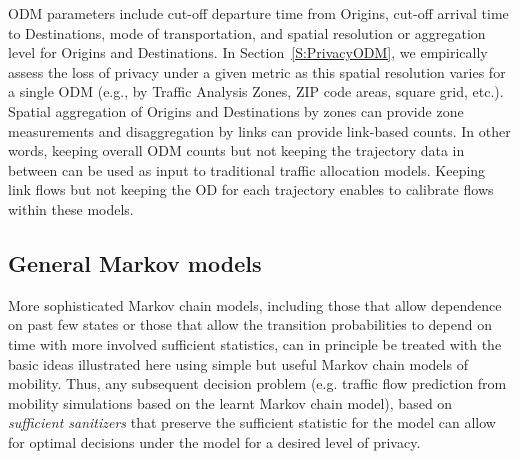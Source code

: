 \documentclass[times,twocolumn,final,authoryear]{elsarticle}
\begin{document}
ODM parameters include cut-off departure time from Origins, cut-off arrival time to Destinations, mode of transportation, and spatial resolution or aggregation level for Origins and Destinations. 
In Section~\ref{S:PrivacyODM}, we empirically assess the loss of privacy under a given metric as this spatial resolution varies for a single ODM (e.g., by Traffic Analysis Zones, ZIP code areas, square grid, etc.). Spatial aggregation of Origins and Destinations by zones can provide zone measurements and disaggregation by links can provide link-based counts. 
In other words, keeping overall ODM counts but not keeping the trajectory data in between can be used as input to traditional traffic allocation models. Keeping link flows but not keeping the OD for each trajectory enables to calibrate flows within these models.


\subsection{General Markov models}
More sophisticated Markov chain models, including those that allow dependence on past few states or those that allow the transition probabilities to depend on time with more involved sufficient statistics, can in principle be treated with the basic ideas illustrated here using simple but useful Markov chain models of mobility. 
Thus, any subsequent decision problem (e.g. traffic flow prediction from mobility simulations based on the learnt Markov chain model), based on {\em sufficient sanitizers} that preserve the sufficient statistic for the model can allow for optimal decisions under the model for a desired level of privacy. 
\end{document}
